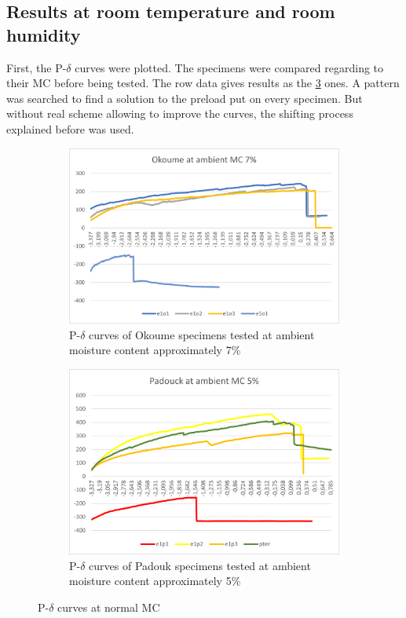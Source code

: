 \subsection{Results at room temperature and room humidity}

First, the P-$\delta$ curves were plotted. The specimens were compared regarding to their MC before being tested. The row data gives results as the \ref{Pdel_room_MC} ones. A pattern was searched to find a solution to the preload put on every specimen. But without real scheme allowing to improve the curves, the shifting process explained before was used.
\begin{figure}[h]
	\centering
	\begin{subfigure}{0.48\linewidth}
		\centering
		\includegraphics[scale=0.5]{Figures/PDelt_OKambient}
		\decoRule
		\caption[Okoume specimens tested at ambient moisture content]{P-$\delta$ curves of Okoume specimens tested at ambient moisture content approximately 7\%}
		\label{fig:Ambient_MC_Ok}
	\end{subfigure}
	\hfill
	\begin{subfigure}{0.48\linewidth}
		\includegraphics[scale=0.5]{Figures/PDelt_padambient}
		\decoRule
		\caption[Padouk specimens tested at ambient moisture content]{P-$\delta$ curves of Padouk specimens tested at ambient moisture content approximately 5\%}
		\label{fig:Ambient_MC_Pad}
	\end{subfigure}
	\caption{P-$\delta$ curves at normal MC}
	\label{Pdel_room_MC}
\end{figure}

